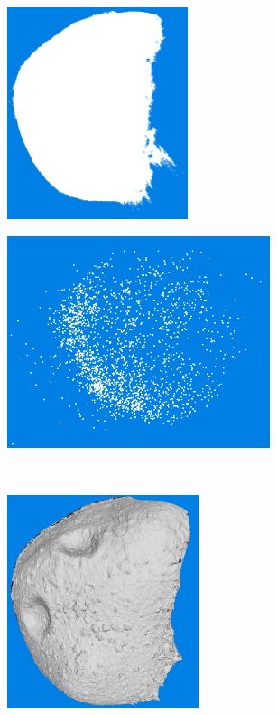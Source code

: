 \begin{figure}[htb]
    \centering
        \begin{subfigure}[b]{0.42\textwidth}
            \centering
            \includegraphics[width=\textwidth,height=6.2cm]{doc/thesis/0_figures/models_quality/50_10/120_50_10_dense2.png}
            \caption{}
            \label{fig:points_50_10}
        \end{subfigure}
        \begin{subfigure}[b]{0.42\textwidth}
            \centering
            \includegraphics[width=\textwidth,height=6.2cm]{doc/thesis/0_figures/models_quality/400_1/120_400_1_points2.png}
            \caption{}
            \label{fig:points_400_1}
        \end{subfigure}
        \\
        \begin{subfigure}[b]{0.42\textwidth}
            \centering
            \includegraphics[width=\textwidth,height=6.2cm]{doc/thesis/0_figures/models_quality/50_10/120_50_10_refine2.png}

\end{subfigure}
\end{figure}

